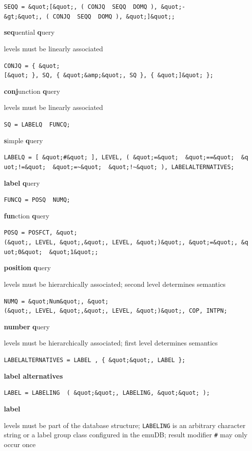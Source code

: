 \documentclass[]{book}
\begin{document}
\texttt{SEQQ\ =\ \&quot;{[}\&quot;,\ (\ CONJQ\ \textbar{}\ SEQQ\ \textbar{}\ DOMQ\ ),\ \&quot;-\&gt;\&quot;,\ (\ CONJQ\ \textbar{}\ SEQQ\ \textbar{}\ DOMQ\ ),\ \&quot;{]}\&quot;;}

\textbf{seq}uential \textbf{q}uery

levels must be linearly associated

\texttt{CONJQ\ =\ \{\ \&quot;{[}\&quot;\ \},\ SQ,\ \{\ \&quot;\&amp;\&quot;,\ SQ\ \},\ \{\ \&quot;{]}\&quot;\ \};}

\textbf{conj}unction \textbf{q}uery

levels must be linearly associated

\texttt{SQ\ =\ LABELQ\ \textbar{}\ FUNCQ;}

\textbf{s}imple \textbf{q}uery

\texttt{LABELQ\ =\ {[}\ \&quot;\#\&quot;\ {]},\ LEVEL,\ (\ \&quot;=\&quot;\ \textbar{}\ \&quot;==\&quot;\ \textbar{}\ \&quot;!=\&quot;\ \textbar{}\ \&quot;=\textasciitilde{}\&quot;\ \textbar{}\ \&quot;!\textasciitilde{}\&quot;\ ),\ LABELALTERNATIVES;}

\textbf{label} \textbf{q}uery

\texttt{FUNCQ\ =\ POSQ\ \textbar{}\ NUMQ;}

\textbf{fun}ction \textbf{q}uery

\texttt{POSQ\ =\ POSFCT,\ \&quot;(\&quot;,\ LEVEL,\ \&quot;,\&quot;,\ LEVEL,\ \&quot;)\&quot;,\ \&quot;=\&quot;,\ \&quot;0\&quot;\ \textbar{}\ \&quot;1\&quot;;}

\textbf{position} \textbf{q}uery

levels must be hierarchically associated; second level determines semantics

\texttt{NUMQ\ =\ \&quot;Num\&quot;,\ \&quot;(\&quot;,\ LEVEL,\ \&quot;,\&quot;,\ LEVEL,\ \&quot;)\&quot;,\ COP,\ INTPN;}

\textbf{number} \textbf{q}uery

levels must be hierarchically associated; first level determines semantics

\texttt{LABELALTERNATIVES\ =\ LABEL\ ,\ \{\ \&quot;\textbar{}\&quot;,\ LABEL\ \};}

\textbf{label alternatives}

\texttt{LABEL\ =\ LABELING\ \textbar{}\ (\ \&quot;\textquotesingle{}\&quot;,\ LABELING,\ \&quot;\textquotesingle{}\&quot;\ );}

\textbf{label}

levels must be part of the database structure; \texttt{LABELING} is an arbitrary character string or a label group class configured in the emuDB; result modifier \texttt{\#} may only occur once
\end{document}
